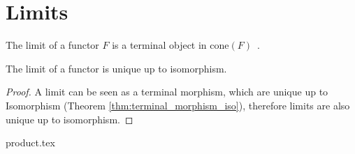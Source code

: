 \section{Limits}

\begin{definition}[Limit]

	The limit of a functor $F$ is a terminal object in
	$\mathrm{cone}(F)$~\parencite[p.~118]{leinster:basic_category_theory}.
\end{definition}

\begin{theorem}
	The limit of a functor is unique up to isomorphism.

	\begin{proof}
		A limit can be seen as a terminal morphism, which are unique up to
		Isomorphism (Theorem \ref{thm:terminal_morphism_iso}), therefore limits are
		also unique up to isomorphism.
	\end{proof}
\end{theorem}

\newpage

{product.tex}



